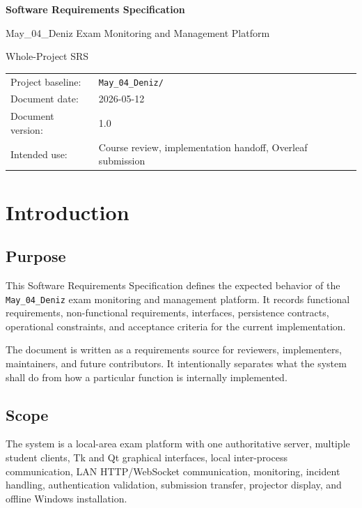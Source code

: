 \documentclass[12pt,a4paper]{article}
\begin{document}
\begin{titlepage}
    \centering
    \vspace*{2cm}
    {\Huge\bfseries Software Requirements Specification\par}
    \vspace{0.6cm}
    {\Large May\_04\_Deniz Exam Monitoring and Management Platform\par}
    \vspace{1.5cm}
    {\large Whole-Project SRS\par}
    \vfill
    \begin{tabular}{ll}
        Project baseline: & \texttt{May\_04\_Deniz/} \\
        Document date: & 2026-05-12 \\
        Document version: & 1.0 \\
        Intended use: & Course review, implementation handoff, Overleaf submission \\
    \end{tabular}
    \vfill
\end{titlepage}

\tableofcontents
\newpage

\section{Introduction}

\subsection{Purpose}

This Software Requirements Specification defines the expected behavior of the
\texttt{May\_04\_Deniz} exam monitoring and management platform. It records
functional requirements, non-functional requirements, interfaces, persistence
contracts, operational constraints, and acceptance criteria for the current
implementation.

The document is written as a requirements source for reviewers, implementers,
maintainers, and future contributors. It intentionally separates what the system
shall do from how a particular function is internally implemented.

\subsection{Scope}

The system is a local-area exam platform with one authoritative server, multiple
student clients, Tk and Qt graphical interfaces, local inter-process
communication, LAN HTTP/WebSocket communication, monitoring, incident handling,
authentication validation, submission transfer, projector display, and offline
Windows installation.
\end{document}

